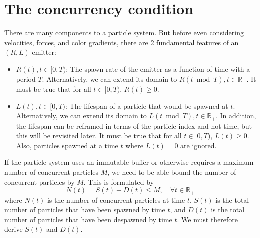 \documentclass[10pt]{report}
\begin{document}
\section{The concurrency condition}
There are many components to a particle system. But before even considering velocities, forces, and color gradients, there are 2 fundamental features of an $(R,L)$-emitter:
\begin{itemize}
\item $R(t),t\in[0,T)$: The spawn rate of the emitter as a function of time with a period $T$. Alternatively, we can extend its domain to $R(t\bmod T),t\in\mathbb{R}_+$. It must be true that for all $t\in[0,T)$, $R(t)\geq0$.
\item $L(t),t\in[0,T)$: The lifespan of a particle that would be spawned at $t$. Alternatively, we can extend its domain to $L(t\bmod T),t\in\mathbb{R}_+$. In addition, the lifespan can be reframed in terms of the particle index and not time, but this will be revisited later. It must be true that for all $t\in[0,T)$, $L(t)\geq0$. Also, particles spawned at a time $t$ where $L(t)=0$ are ignored.
\end{itemize}
If the particle system uses an immutable buffer or otherwise requires a maximum number of concurrent particles $M$, we need to be able bound the number of concurrent particles by $M$. This is formulated by
\begin{equation}N(t)=S(t)-D(t)\leq M,\quad\forall t\in\mathbb{R}_+\end{equation}
where $N(t)$ is the number of concurrent particles at time $t$, $S(t)$ is the total number of particles that have been spawned by time $t$, and $D(t)$ is the total number of particles that have been despawned by time $t$. We must therefore derive $S(t)$ and $D(t)$.
\end{document}

